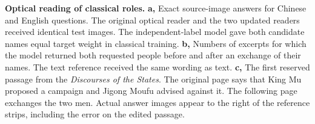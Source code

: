 \textbf{Optical reading of classical roles.}
\textbf{a,} Exact source-image answers for Chinese and English questions. The original optical reader and the two updated readers received identical test images. The independent-label model gave both candidate names equal target weight in classical training. \textbf{b,} Numbers of excerpts for which the model returned both requested people before and after an exchange of their names. The text reference received the same wording as text. \textbf{c,} The first reserved passage from the \textit{Discourses of the States}. The original page says that King Mu proposed a campaign and Jigong Moufu advised against it. The following page exchanges the two men. Actual answer images appear to the right of the reference strips, including the error on the edited passage.
